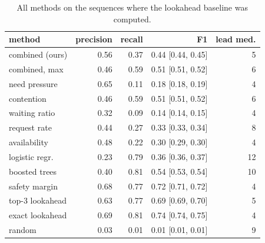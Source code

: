 \begin{table}[t]
\centering
\footnotesize
\caption{All methods on the sequences where the lookahead baseline was computed.}
\label{tab:lookahead}
\begin{tabular}{lrrrr}
\toprule
method & precision & recall & F1 & lead med. \\
\midrule
combined (ours) & 0.56 & 0.37 & 0.44 [0.44, 0.45] & 5 \\
combined, max & 0.46 & 0.59 & 0.51 [0.51, 0.52] & 6 \\
need pressure & 0.65 & 0.11 & 0.18 [0.18, 0.19] & 4 \\
contention & 0.46 & 0.59 & 0.51 [0.51, 0.52] & 6 \\
waiting ratio & 0.32 & 0.09 & 0.14 [0.14, 0.15] & 4 \\
request rate & 0.44 & 0.27 & 0.33 [0.33, 0.34] & 8 \\
availability & 0.48 & 0.22 & 0.30 [0.29, 0.30] & 4 \\
logistic regr. & 0.23 & 0.79 & 0.36 [0.36, 0.37] & 12 \\
boosted trees & 0.40 & 0.81 & 0.54 [0.53, 0.54] & 10 \\
safety margin & 0.68 & 0.77 & 0.72 [0.71, 0.72] & 4 \\
top-3 lookahead & 0.63 & 0.77 & 0.69 [0.69, 0.70] & 5 \\
exact lookahead & 0.69 & 0.81 & 0.74 [0.74, 0.75] & 4 \\
random & 0.03 & 0.01 & 0.01 [0.01, 0.01] & 9 \\
\bottomrule
\end{tabular}
\end{table}
